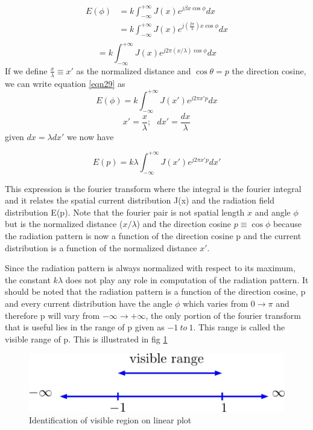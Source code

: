 \begin{align*}
E(\phi) &= k\int_{-\infty}^{+\infty}J(x) e^{j\beta x \cos\phi}dx \\
&= k\int_{-\infty}^{+\infty}J(x) e^{j(\frac{2\pi}{\lambda}) x \cos\phi}dx\\
\end{align*}
\begin{equation}
=k\int_{-\infty}^{+\infty}J(x) e^{j2\pi(x/\lambda)  \cos\phi}dx
\label{eqn29}
\end{equation}
If we define $\frac{x}{\lambda} \equiv x'$ as the normalized distance and $\cos\theta = p$ 
the direction cosine, we can write equation \ref{eqn29} as 
$$E(\phi) = k\int_{-\infty}^{+\infty}J(x') e^{j2\pi x' p }dx$$
$$ x' = \frac{x}{\lambda}; \ \ \ dx' = \frac{dx}{\lambda}$$
given $dx = \lambda dx'$ we now have

\begin{equation}
E(p) = k\lambda\int_{-\infty}^{+\infty}J(x') e^{j2\pi x' p}dx'
\label{eqn30}	
\end{equation}

This expression is the fourier transform where  the integral is the fourier integral and it relates the spatial current distribution J(x) and the radiation field distribution E(p). Note that the fourier pair is not spatial length $x$ and angle  $\phi$ but is the normalized distance  ($x/\lambda$) and the direction cosine $ p \equiv \cos\phi$ because the radiation pattern is now a function of the direction cosine p and the current distribution is a function of the normalized distance $x'$.

Since the radiation pattern is always normalized with respect to its maximum, the constant $k\lambda$ does not play any role in computation of the radiation pattern. It should be noted that the radiation pattern is a function of the direction cosine, p and every current distribution have the angle $\phi$ which varies from $0\to\pi$ and therefore p will vary from $-\infty\to +\infty$, the only portion of the fourier transform that is useful lies in the range of p given as $-1 \ to\ 1$. This range is called the visible range of p. This is illustrated in fig \ref{fig:8}
\begin{figure}[h]
\centering
\includegraphics[width=1\linewidth]{./graphics/n8}
\caption{Identification of visible region on linear plot}
\label{fig:8}
\end{figure}

